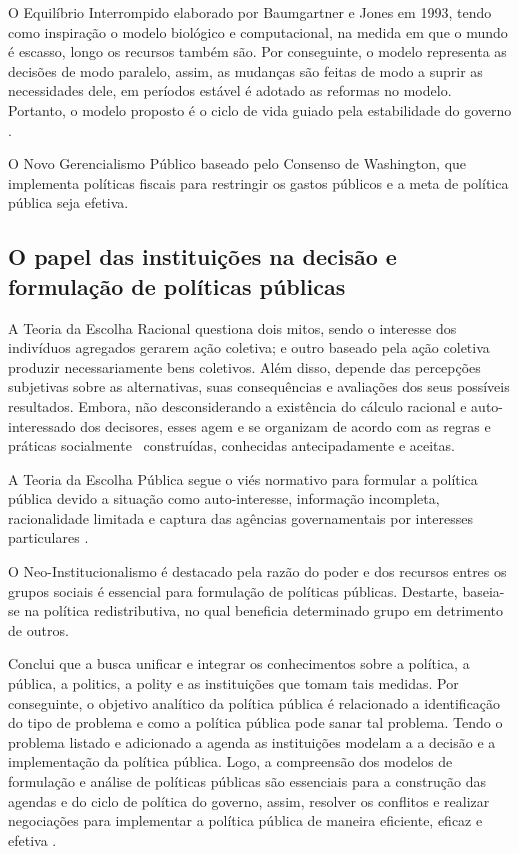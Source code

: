 O Equilíbrio Interrompido elaborado por Baumgartner e Jones em 1993, tendo como inspiração o modelo biológico e computacional, na medida em que o mundo é escasso, longo os recursos também são. 
Por conseguinte, o modelo representa as decisões de modo paralelo, assim, as mudanças são feitas de modo a suprir as necessidades dele, em períodos estável é adotado as reformas no modelo.  
Portanto, o modelo proposto é o ciclo de vida guiado pela estabilidade do governo \cite{souza2006politicas}.

O Novo Gerencialismo Público baseado pelo Consenso de Washington, que implementa políticas fiscais para restringir os gastos públicos e a meta de política pública seja efetiva.


\subsection{O papel das instituições na decisão e formulação de políticas públicas}


A Teoria da Escolha Racional questiona dois mitos, sendo o interesse dos indivíduos agregados gerarem ação coletiva; e outro baseado pela ação coletiva produzir necessariamente bens coletivos.
Além disso, depende das percepções subjetivas sobre as alternativas, suas consequências e avaliações dos seus possíveis resultados.
Embora, não desconsiderando a existência do cálculo racional e auto-interessado dos decisores, esses agem e se organizam de acordo com as regras e práticas socialmente  construídas, conhecidas antecipadamente e aceitas.

A Teoria da Escolha Pública segue o viés normativo para formular a política pública devido a situação como auto-interesse, informação incompleta, racionalidade limitada e captura das agências governamentais por interesses particulares \cite{souza2006politicas}.

O Neo-Institucionalismo é destacado pela razão do poder e dos recursos entres os grupos sociais é essencial para formulação de políticas públicas.
Destarte, baseia-se na política redistributiva, no qual beneficia determinado grupo em detrimento de outros.

Conclui que a busca unificar e integrar os conhecimentos sobre a política, a pública, a politics, a polity e as instituições que tomam tais medidas.
Por conseguinte, o objetivo analítico da política pública é relacionado a identificação do tipo de problema e como a política pública pode sanar tal problema.
Tendo o problema listado e adicionado a agenda as instituições modelam a a decisão e a implementação da política pública.   
Logo, a compreensão dos modelos de formulação e análise de políticas públicas são essenciais para a construção das agendas e do ciclo de política do governo, assim, resolver os conflitos e realizar negociações para implementar a política pública de maneira eficiente, eficaz e efetiva \cite{souza2006politicas}.

